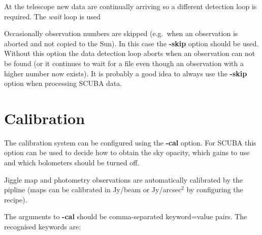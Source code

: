 \documentclass[twoside,11pt]{article}
\newcommand{\xlabel}[1]{}
\renewcommand{\_}{\texttt{\symbol{95}}}
\begin{document}
At the telescope new data are continually arriving so a different detection
loop is required. The \textit{wait} loop is used

Occasionally observation numbers are skipped (e.g.\ when an observation is
aborted and not copied to the Sun). In this case the \textbf{-skip} option
should be used. Without this option the data detection loop aborts when
an observation can not be found (or it continues to wait for a file even
though an observation with a higher number now exists).
It is probably a good idea to always use the \textbf{-skip}
option when processing SCUBA data.


\section{Calibration\label{sec:cal}\xlabel{calibration}}

The calibration system can be configured using the \textbf{-cal} option.
For SCUBA this option can be used to decide how to obtain the sky opacity,
which gains to use and which bolometers should be turned off.

Jiggle map and photometry observations are automatically calibrated
by the pipline (maps can be calibrated in Jy/beam or Jy/arcsec$^2$
by configuring the recipe).

The arguments to \textbf{-cal} should be comma-separated
keyword=value pairs. The recognised keywords are:
\end{document}
